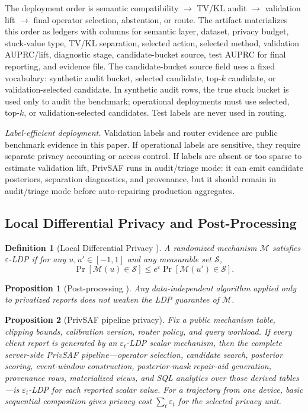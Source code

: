 \documentclass[conference]{IEEEtran}
\newtheorem{definition}{Definition}
\newtheorem{proposition}{Proposition}
\begin{document}
The deployment order is semantic compatibility \(\rightarrow\) TV/KL audit \(\rightarrow\) validation lift \(\rightarrow\) final operator selection, abstention, or route. The artifact materializes this order as ledgers with columns for semantic layer, dataset, privacy budget, stuck-value type, TV/KL separation, selected action, selected method, validation AUPRC/lift, diagnostic stage, candidate-bucket source, test AUPRC for final reporting, and evidence file. The candidate-bucket source field uses a fixed vocabulary: synthetic audit bucket, selected candidate, top-\(k\) candidate, or validation-selected candidate. In synthetic audit rows, the true stuck bucket is used only to audit the benchmark; operational deployments must use selected, top-\(k\), or validation-selected candidates. Test labels are never used in routing.

\noindent\emph{Label-efficient deployment.}
Validation labels and router evidence are public benchmark evidence in this paper. If operational labels are sensitive, they require separate privacy accounting or access control. If labels are absent or too sparse to estimate validation lift, PrivSAF runs in audit/triage mode: it can emit candidate posteriors, separation diagnostics, and provenance, but it should remain in audit/triage mode before auto-repairing production aggregates.

\subsection{Local Differential Privacy and Post-Processing}

\begin{definition}[Local Differential Privacy \cite{kasiviswanathan2011what}]
A randomized mechanism \(\mathcal{M}\) satisfies \(\varepsilon\)-LDP if for any \(u,u'\in[-1,1]\) and any measurable set \(\mathcal{S}\),
\[
\Pr[\mathcal{M}(u)\in\mathcal{S}]
\le
e^{\varepsilon}
\Pr[\mathcal{M}(u')\in\mathcal{S}].
\]
\end{definition}

\begin{proposition}[Post-processing \cite{dworkroth2014}]
Any data-independent algorithm applied only to privatized reports does not weaken the LDP guarantee of \(\mathcal{M}\).
\end{proposition}

\begin{proposition}[PrivSAF pipeline privacy]
Fix a public mechanism table, clipping bounds, calibration version, router policy, and query workload. If every client report is generated by an \(\varepsilon_t\)-LDP scalar mechanism, then the complete server-side PrivSAF pipeline---operator selection, candidate search, posterior scoring, event-window construction, posterior-mask repair-aid generation, provenance rows, materialized views, and SQL analytics over those derived tables---is \(\varepsilon_t\)-LDP for each reported scalar value. For a trajectory from one device, basic sequential composition gives privacy cost \(\sum_t \varepsilon_t\) for the selected privacy unit.
\end{proposition}
\end{document}
